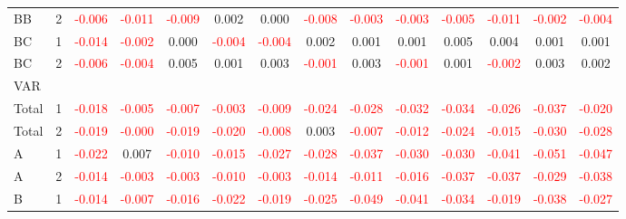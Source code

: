 \begin{table}[!htb]
{\begin{tabular}{llcccccccccccc}
BB & 2 & \textcolor{red}{-0.006} & \textcolor{red}{-0.011} & \textcolor{red}{-0.009} & 0.002 & 0.000 & \textcolor{red}{-0.008} & \textcolor{red}{-0.003} & \textcolor{red}{-0.003} & \textcolor{red}{-0.005} & \textcolor{red}{-0.011} & \textcolor{red}{-0.002} & \textcolor{red}{-0.004}\\
BC & 1 & \textcolor{red}{-0.014} & \textcolor{red}{-0.002} & 0.000 & \textcolor{red}{-0.004} & \textcolor{red}{-0.004} & 0.002 & 0.001 & 0.001 & 0.005 & 0.004 & 0.001 & 0.001\\
BC & 2 & \textcolor{red}{-0.006} & \textcolor{red}{-0.004} & 0.005 & 0.001 & 0.003 & \textcolor{red}{-0.001} & 0.003 & \textcolor{red}{-0.001} & 0.001 & \textcolor{red}{-0.002} & 0.003 & 0.002\\
\hline
VAR &  &  &  &  &  &  &  &  &  &  &  &  & \\
\hline
Total & 1 & \textcolor{red}{-0.018} & \textcolor{red}{-0.005} & \textcolor{red}{-0.007} & \textcolor{red}{-0.003} & \textcolor{red}{-0.009} & \textcolor{red}{-0.024} & \textcolor{red}{-0.028} & \textcolor{red}{-0.032} & \textcolor{red}{-0.034} & \textcolor{red}{-0.026} & \textcolor{red}{-0.037} & \textcolor{red}{-0.020}\\
Total & 2 & \textcolor{red}{-0.019} & \textcolor{red}{-0.000} & \textcolor{red}{-0.019} & \textcolor{red}{-0.020} & \textcolor{red}{-0.008} & 0.003 & \textcolor{red}{-0.007} & \textcolor{red}{-0.012} & \textcolor{red}{-0.024} & \textcolor{red}{-0.015} & \textcolor{red}{-0.030} & \textcolor{red}{-0.028}\\
A & 1 & \textcolor{red}{-0.022} & 0.007 & \textcolor{red}{-0.010} & \textcolor{red}{-0.015} & \textcolor{red}{-0.027} & \textcolor{red}{-0.028} & \textcolor{red}{-0.037} & \textcolor{red}{-0.030} & \textcolor{red}{-0.030} & \textcolor{red}{-0.041} & \textcolor{red}{-0.051} & \textcolor{red}{-0.047}\\
A & 2 & \textcolor{red}{-0.014} & \textcolor{red}{-0.003} & \textcolor{red}{-0.003} & \textcolor{red}{-0.010} & \textcolor{red}{-0.003} & \textcolor{red}{-0.014} & \textcolor{red}{-0.011} & \textcolor{red}{-0.016} & \textcolor{red}{-0.037} & \textcolor{red}{-0.037} & \textcolor{red}{-0.029} & \textcolor{red}{-0.038}\\
B & 1 & \textcolor{red}{-0.014} & \textcolor{red}{-0.007} & \textcolor{red}{-0.016} & \textcolor{red}{-0.022} & \textcolor{red}{-0.019} & \textcolor{red}{-0.025} & \textcolor{red}{-0.049} & \textcolor{red}{-0.041} & \textcolor{red}{-0.034} & \textcolor{red}{-0.019} & \textcolor{red}{-0.038} & \textcolor{red}{-0.027}\\

\end{tabular}}
\end{table}
